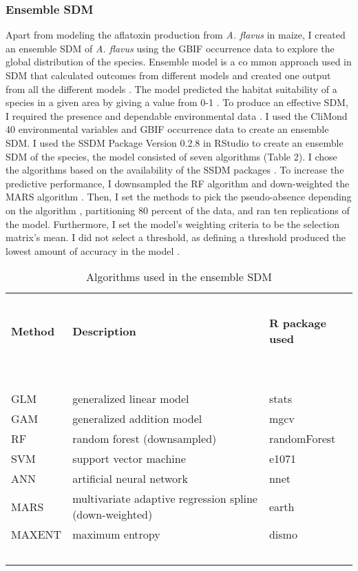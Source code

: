 \subsubsection{Ensemble SDM}
Apart from modeling the aflatoxin production from \textit{A. flavus} in maize, I created an ensemble SDM of \textit{A. flavus} using the GBIF  occurrence data to explore the global distribution of the species. Ensemble model is a co mmon approach used in SDM that calculated outcomes from different models and created one output from all the different models \citep{hao2020testing}. The model predicted the habitat suitability of a species in a given area by giving a value from 0-1 \citep{monnier2023species}. To produce an effective SDM, I required the presence and dependable environmental data \citep{barbet2012selecting}. I used the CliMond 40 environmental variables and GBIF  occurrence data to create an ensemble SDM. I used the SSDM Package Version 0.2.8 \citep{SSDM} in RStudio to create an ensemble SDM of the species, the model consisted of seven algorithms (Table 2). I chose the algorithms based on the availability of the SSDM packages . To increase the predictive performance, I downsampled the RF algorithm and down-weighted the MARS algorithm \citep{valavi2022predictive}. Then, I set the methods to pick the pseudo-absence depending on the algorithm \citep{barbet2012selecting}, partitioning 80 percent of the data, and ran ten replications of the model. Furthermore, I set the model's weighting criteria to be the selection matrix's mean. I did not select a threshold, as defining a threshold produced the lowest amount of accuracy in the model \citep{liu2005selecting}.
\\ 
\vspace{\baselineskip}
\vspace{\baselineskip}

\begin{table}[!ht]
    \caption{Algorithms used in the ensemble SDM}
    \centering
    \begin{tabular}{lll}
        \hline
        ~ & ~ & ~  \\
        \textbf{Method} & \textbf{Description} & \textbf{R package used} \\ 
        ~ & ~ & ~  \\ \hline\hline
        ~ & ~ & ~  \\ 
        GLM & generalized linear model & stats \\ 
        GAM & generalized  addition model & mgcv \\ 
        RF & random forest (downsampled) & randomForest \\ 
        SVM & support vector machine & e1071 \\ 
        ANN & artificial neural network & nnet \\ 
        MARS & multivariate adaptive regression spline (down-weighted) & earth \\ 
        MAXENT & maximum entropy & dismo \\ 
        ~ & ~ & ~  \\ \hline
    \end{tabular}
    \label{Ensemble_Model_Algorithms}
\end{table}

